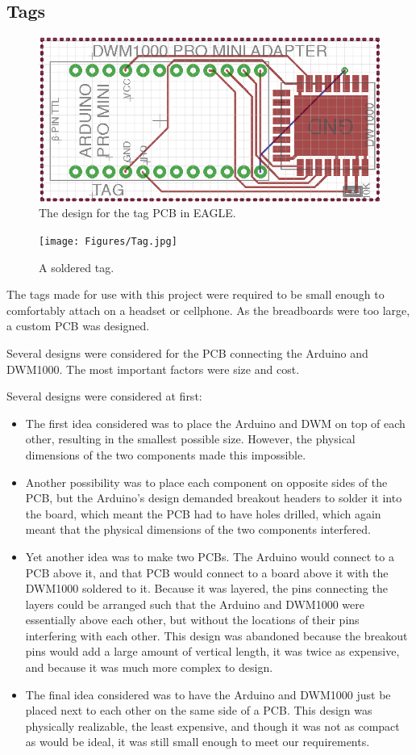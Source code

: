 \subsection{Tags}
\begin{figure}
	\centering
	\includegraphics[width=\linewidth]{Figures/PCB.png}
	\decoRule
	\caption{The design for the tag PCB in EAGLE.}
	\label{fig:PCB}
\end{figure}

\begin{figure}
	\centering
	\texttt{[image: Figures/Tag.jpg]}
	\decoRule
	\caption{A soldered tag.}
	\label{fig:Tag}
\end{figure}
The tags made for use with this project were required to be small enough to comfortably attach on a headset or cellphone. As the breadboards were too large, a custom PCB was designed.

Several designs were considered for the PCB connecting the Arduino and DWM1000. The most important factors were size and cost.

Several designs were considered at first:
\begin{itemize}
	\item The first idea considered was to place the Arduino and DWM on top of each other, resulting in the smallest possible size. However, the physical dimensions of the two components made this impossible. 
	\item Another possibility was to place each component on opposite sides of the PCB, but the Arduino's design demanded breakout headers to solder it into the board, which meant the PCB had to have holes drilled, which again meant that the physical dimensions of the two components interfered.
	\item Yet another idea was to make two PCBs. The Arduino would connect to a PCB above it, and that PCB would connect to a board above it with the DWM1000 soldered to it. Because it was layered, the pins connecting the layers could be arranged such that the Arduino and DWM1000 were essentially above each other, but without the locations of their pins interfering with each other. This design was abandoned because the breakout pins would add a large amount of vertical length, it was twice as expensive, and because it was much more complex to design.
	\item The final idea considered was to have the Arduino and DWM1000 just be placed next to each other on the same side of a PCB. This design was physically realizable, the least expensive, and though it was not as compact as would be ideal, it was still small enough to meet our requirements.
\end{itemize}

